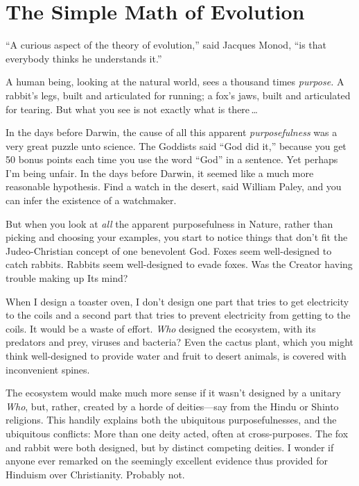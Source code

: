 \myendsectiontext

\chapter{The Simple Math of Evolution}


{
 ``A curious aspect of the theory of
evolution,'' said Jacques Monod,
``is that everybody thinks he understands
it.'' }

{
 A human being, looking at the natural world, sees a thousand times
\textit{purpose.} A rabbit's legs, built and
articulated for running; a fox's jaws, built and
articulated for tearing. But what you see is not exactly what is there\,\ldots}

{
 In the days before Darwin, the cause of all this apparent
\textit{purposefulness} was a very great puzzle unto science. The
Goddists said ``God did it,''
because you get 50 bonus points each time you use the word
``God'' in a sentence. Yet perhaps
I'm being unfair. In the days before Darwin, it seemed
like a much more reasonable hypothesis. Find a watch in the desert,
said William Paley, and you can infer the existence of a watchmaker.}

{
 But when you look at \textit{all} the apparent purposefulness in
Nature, rather than picking and choosing your examples, you start to
notice things that don't fit the Judeo-Christian
concept of one benevolent God. Foxes seem well-designed to catch
rabbits. Rabbits seem well-designed to evade foxes. Was the Creator
having trouble making up Its mind?}

{
 When I design a toaster oven, I don't design one
part that tries to get electricity to the coils and a second part that
tries to prevent electricity from getting to the coils. It would be a
waste of effort. \textit{Who} designed the ecosystem, with its
predators and prey, viruses and bacteria? Even the cactus plant, which
you might think well-designed to provide water and fruit to desert
animals, is covered with inconvenient spines.}

{
 The ecosystem would make much more sense if it
wasn't designed by a unitary \textit{Who}, but, rather,
created by a horde of deities---say from the Hindu or Shinto religions.
This handily explains both the ubiquitous purposefulnesses, and the
ubiquitous conflicts: More than one deity acted, often at
cross-purposes. The fox and rabbit were both designed, but by distinct
competing deities. I wonder if anyone ever remarked on the seemingly
excellent evidence thus provided for Hinduism over Christianity.
Probably not.}

